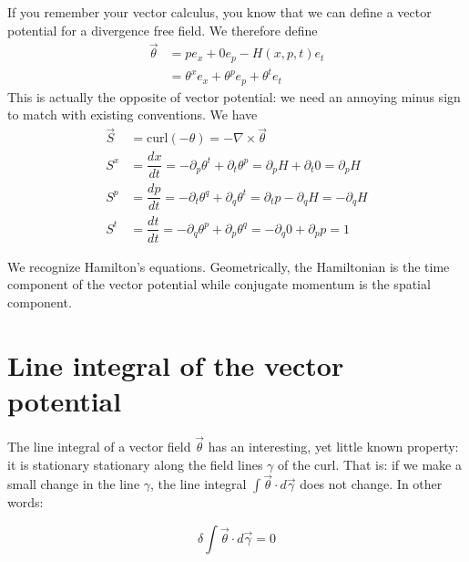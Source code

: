 \documentclass[aps,pra,10pt,floatfix,nofootinbib]{revtex4-1}
\theoremstyle{definition}
\begin{document}
If you remember your vector calculus, you know that we can define a vector potential for a divergence free field. We therefore define
\begin{equation}
\begin{aligned}
\vec{\theta} &= p e_x + 0 e_p - H(x,p,t) e_t \\ 
&= \theta^x e_x + \theta^p e_p + \theta^t e_t 
\end{aligned}
\label{flow}
\end{equation}
This is actually the opposite of vector potential: we need an annoying minus sign to match with existing conventions. We have
\begin{equation}
\begin{aligned}
\vec{S} &= \mathrm{curl}(-\theta) = - \nabla \times \vec{\theta} \\
S^x &= \dfrac{dx}{dt} = - \partial_p \theta^t + \partial_t \theta^p = \partial_p H + \partial_t 0 = \partial_p H \\
S^p &= \dfrac{dp}{dt} = - \partial_t \theta^q + \partial_q \theta^t = \partial_t p - \partial_q H = - \partial_q H \\
S^t &= \dfrac{dt}{dt} = - \partial_q \theta^p + \partial_p \theta^q = - \partial_q 0 + \partial_p p = 1
\end{aligned}
\label{HamiltonEquations}
\end{equation}

We recognize Hamilton's equations. Geometrically, the Hamiltonian is the time component of the vector potential while conjugate momentum is the spatial component.

\section{Line integral of the vector potential}

The line integral of a vector field $\vec{\theta}$ has an interesting, yet little known property: it is stationary stationary along the field lines $\gamma$ of the curl. That is: if we make a small change in the line $\gamma$, the line integral $\int \vec{\theta} \cdot d\vec{\gamma}$ does not change. In other words:

\begin{equation}
\delta \int \vec{\theta} \cdot d\vec{\gamma} = 0
\label{stationaryLineIntegral}
\end{equation}
\end{document}
